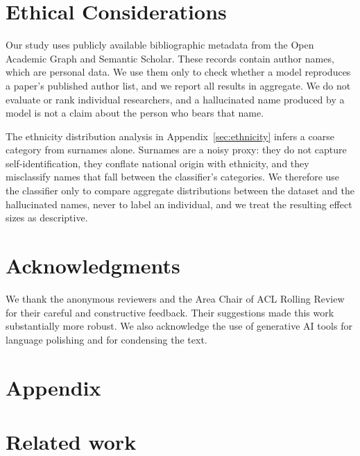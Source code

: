 \documentclass[11pt]{article}
\begin{document}
\section*{Ethical Considerations}

Our study uses publicly available bibliographic metadata from the Open Academic Graph and Semantic Scholar. These records contain author names, which are personal data. We use them only to check whether a model reproduces a paper's published author list, and we report all results in aggregate. We do not evaluate or rank individual researchers, and a hallucinated name produced by a model is not a claim about the person who bears that name.

The ethnicity distribution analysis in Appendix~\ref{sec:ethnicity} infers a coarse category from surnames alone. Surnames are a noisy proxy: they do not capture self-identification, they conflate national origin with ethnicity, and they misclassify names that fall between the classifier's categories. We therefore use the classifier only to compare aggregate distributions between the dataset and the hallucinated names, never to label an individual, and we treat the resulting effect sizes as descriptive.

\section*{Acknowledgments}

We thank the anonymous reviewers and the Area Chair of ACL Rolling Review for their careful and constructive feedback. Their suggestions made this work substantially more robust. We also acknowledge the use of generative AI tools for language polishing and for condensing the text.



\appendix
\setcounter{figure}{0}
\renewcommand{\thesection}{A\arabic{section}}
\setcounter{section}{0}
\renewcommand{\thetable}{A\arabic{table}}
\setcounter{table}{0}
\renewcommand{\thefigure}{A\arabic{figure}}
\setcounter{figure}{0}
\renewcommand{\theequation}{A\arabic{equation}}
\setcounter{equation}{0}

\section*{Appendix}

\section{Related work}
\label{sec:appendix_related_work}
\end{document}
